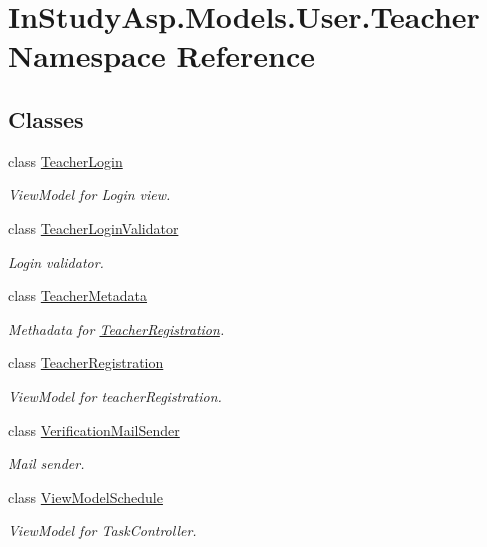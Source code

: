 \hypertarget{namespace_in_study_asp_1_1_models_1_1_user_1_1_teacher}{}\section{In\+Study\+Asp.\+Models.\+User.\+Teacher Namespace Reference}
\label{namespace_in_study_asp_1_1_models_1_1_user_1_1_teacher}
\subsection*{Classes}
\begin{DoxyCompactItemize}
\item 
class \hyperlink{class_in_study_asp_1_1_models_1_1_user_1_1_teacher_1_1_teacher_login}{Teacher\+Login}
\begin{DoxyCompactList}\small\item\em View\+Model for Login view. \end{DoxyCompactList}\item 
class \hyperlink{class_in_study_asp_1_1_models_1_1_user_1_1_teacher_1_1_teacher_login_validator}{Teacher\+Login\+Validator}
\begin{DoxyCompactList}\small\item\em Login validator. \end{DoxyCompactList}\item 
class \hyperlink{class_in_study_asp_1_1_models_1_1_user_1_1_teacher_1_1_teacher_metadata}{Teacher\+Metadata}
\begin{DoxyCompactList}\small\item\em Methadata for \hyperlink{class_in_study_asp_1_1_models_1_1_user_1_1_teacher_1_1_teacher_registration}{Teacher\+Registration}. \end{DoxyCompactList}\item 
class \hyperlink{class_in_study_asp_1_1_models_1_1_user_1_1_teacher_1_1_teacher_registration}{Teacher\+Registration}
\begin{DoxyCompactList}\small\item\em View\+Model for teacher\+Registration. \end{DoxyCompactList}\item 
class \hyperlink{class_in_study_asp_1_1_models_1_1_user_1_1_teacher_1_1_verification_mail_sender}{Verification\+Mail\+Sender}
\begin{DoxyCompactList}\small\item\em Mail sender. \end{DoxyCompactList}\item 
class \hyperlink{class_in_study_asp_1_1_models_1_1_user_1_1_teacher_1_1_view_model_schedule}{View\+Model\+Schedule}
\begin{DoxyCompactList}\small\item\em View\+Model for Task\+Controller. \end{DoxyCompactList}\end{DoxyCompactItemize}
